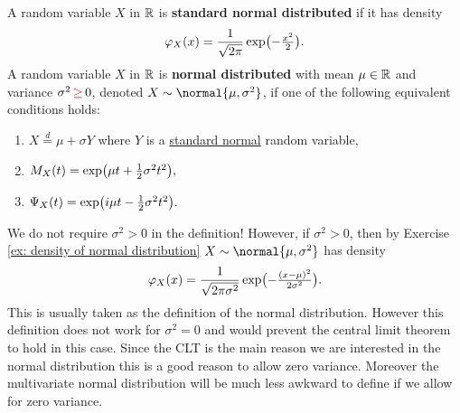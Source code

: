 \begin{definition}
    \label{def: univariate normal distribution}
    A random variable \(X\) in \(\mathbb{R}\) is \textbf{standard normal
    distributed} if it has density
    \begin{equation}
        \label{eq: standard normal density}
        \varphi_X(x)
        = \frac1{\sqrt{2\pi}}
        \exp\bigl(-\tfrac{x^2}{2}\bigr).
    \end{equation}
    A random variable \(X\) in \(\mathbb{R}\) is \textbf{normal
    distributed} with mean \(\mu \in \mathbb{R}\) and variance \(\sigma^2 \mathop{{\color{red} \ge}} 0\),
    denoted \(X \sim \normal{\mu, \sigma^2}\), if one of the following
    equivalent conditions holds:
    \begin{enumerate}[label=(\roman*)]
        \item\label{it: standard normal} \(X \overset{d}= \mu + \sigma Y\) where \(Y\) is a \underline{standard normal} random variable,

        \item\label{it: mgf normal}
        \(
            M_X(t)
            = \exp\bigl(\mu t + \tfrac12 \sigma^2 t^2\bigr),
        \)

        \item\label{it: char fct normal}
        \(
            \Psi_X(t)
            = \exp\bigl(i \mu t - \tfrac12 \sigma^2 t^2\bigr).
        \)
    \end{enumerate}
\end{definition}
\begin{remark}
    We do not require \(\sigma^2 > 0\) in the definition! However, if
    \(\sigma^2>0\), then by Exercise \ref{ex: density of normal distribution} \(X\sim \normal{\mu, \sigma^2}\) has density
    \[
        \varphi_X(x) = \frac1{\sqrt{2\pi \sigma^2}}
        \exp\bigl(-\tfrac{(x-\mu)^2}{2\sigma^2}\bigr).
    \]
    This is usually taken as the definition of the normal distribution. However
    this definition does not work for \(\sigma^2=0\) and would prevent the
    central limit theorem to hold in this case. Since the CLT is the main
    reason we are interested in the normal distribution this is a good
    reason to allow zero variance. Moreover the multivariate normal distribution
    will be much less awkward to define if we allow for zero variance.
\end{remark}
